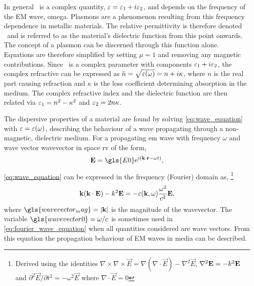 \documentclass{article}
\begin{document}
In general \eps\ is a complex quantity, $\varepsilon=\varepsilon_1+i\varepsilon_2$, and depends on the frequency of the EM wave, \gls{omega}. Plasmons are a phenomenon resulting from this frequency dependence in metallic materials. The relative permittivity is therefore denoted \dielectric\ and is referred to as the material's dielectric function from this point onwards. The concept of a plasmon can be discerned through this function alone. Equations are therefore simplified by setting $\mu=1$ and removing any magnetic contributions.
Since \dielectric\ is a complex parameter with components $\varepsilon_1+i\varepsilon_2$, the complex refractive can be expressed as $\tilde{n}=\sqrt{\varepsilon(\omega)}=n+i\kappa$, where $n$ is the real part causing refraction and $\kappa$ is the loss coefficient determining absorption in the medium. The complex refractive index and the dielectric function are then related via $\varepsilon_1=n^2-\kappa^2$ and $\varepsilon_2 = 2n\kappa$.

The dispersive properties of a material are found by solving \eqref{eq:wave_equation} with $\varepsilon=\varepsilon(\omega)$, describing the behaviour of a wave propagating through a non-magnetic, dielectric medium. For a propagating \gls{em} wave with frequency $\omega$ and wave vector \gls{wavevector} in space \gls{rv} of the form,
\begin{equation}
	\vec{E} = \gls{E0} \e^{i(\wv \cdot \vec{r} - \omega t)},
	\label{eq:wave}
\end{equation}
\eqref{eq:wave_equation} can be expressed in the frequency (Fourier) domain as,%
\footnote{Derived using the identities $\nabla \times \nabla \times \vec{E} = \nabla(\nabla\cdot\vec{E}) - \nabla^2\vec{E}$, $\nabla^2\mathbf{E}=-k^2\mathbf{E}$ and $\partial^2\vec{E}/\partial t^2 = -\omega^2\vec{E}$ where $\nabla\cdot\vec{E}=0$}
\begin{equation}
	\mathbf{k}(\mathbf{k}\cdot\mathbf{E}) - k^2\mathbf{E} = -\varepsilon(\mathbf{k}, \omega) \frac{\omega^2}{c^2}\mathbf{E},
	\label{eq:fourier_wave_equation}
\end{equation}
where $\gls{wavevector_mag}=|\wv|$ is the magnitude of the wavevector. The variable $\gls{wavevector0} = \omega/c$ is sometimes used in \eqref{eq:fourier_wave_equation} when all quantities considered are wave vectors. From this equation the propagation behaviour of EM waves in media can be described.
\end{document}
